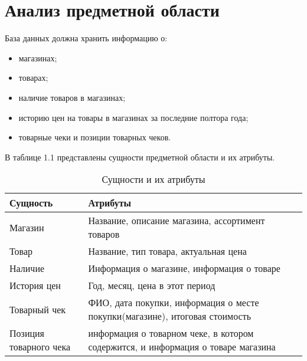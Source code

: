 \documentclass[a4paper]{bmstu}
\begin{document}
\section{Анализ предметной области}

База данных должна хранить информацию о:

\begin{itemize}
	\item магазинах;
	\item товарах;
	\item наличие товаров в магазинах;
	\item историю цен на товары в магазинах за последние полтора года;
	\item товарные чеки и позиции товарных чеков.
\end{itemize}

В таблице 1.1 представлены сущности предметной области и их атрибуты.

\begin{table}[H]
	\caption{Сущности и их атрибуты}
	\begin{center}
		\begin{tabular}{| l | p{11 cm} |} 
			\hline
			
			\textbf{Сущность} & \textbf{Атрибуты} \\  
			
			\hline
			
			Магазин & Название, описание магазина, ассортимент товаров \\
			
			\hline
			
			Товар & Название, тип товара, актуальная цена \\
			
			\hline
			
			Наличие & Информация о магазине, информация о товаре \\
			
			\hline
			
			История цен & Год, месяц, цена в этот период \\
			
			\hline
			
			Товарный чек & ФИО, дата покупки, информация о месте покупки(магазине), итоговая стоимость \\
			\hline
			
			Позиция товарного чека & информация о товарном чеке, в котором содержится, и информация о товаре магазина \\
			\hline
		\end{tabular}
	\end{center}
\end{table}
\end{document}
